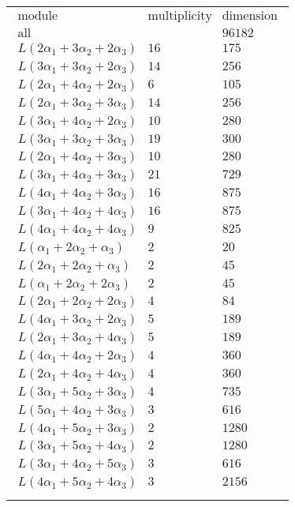 \documentclass[crop,border=2mm]{standalone}
\begin{document}
\begin{tabular}{l}
$\displaystyle
\begin{array}{rll}
	\text{module}&\text{multiplicity}&\text{dimension} \\ \hline \text{all}&&96182 \\
	L\left( 2\alpha_{1}+ 3\alpha_{2}+ 2\alpha_{3}\right)&16&175\\
	L\left( 3\alpha_{1}+ 3\alpha_{2}+ 2\alpha_{3}\right)&14&256\\
	L\left( 2\alpha_{1}+ 4\alpha_{2}+ 2\alpha_{3}\right)&6&105\\
	L\left( 2\alpha_{1}+ 3\alpha_{2}+ 3\alpha_{3}\right)&14&256\\
	L\left( 3\alpha_{1}+ 4\alpha_{2}+ 2\alpha_{3}\right)&10&280\\
	L\left( 3\alpha_{1}+ 3\alpha_{2}+ 3\alpha_{3}\right)&19&300\\
	L\left( 2\alpha_{1}+ 4\alpha_{2}+ 3\alpha_{3}\right)&10&280\\
	L\left( 3\alpha_{1}+ 4\alpha_{2}+ 3\alpha_{3}\right)&21&729\\
	L\left( 4\alpha_{1}+ 4\alpha_{2}+ 3\alpha_{3}\right)&16&875\\
	L\left( 3\alpha_{1}+ 4\alpha_{2}+ 4\alpha_{3}\right)&16&875\\
	L\left( 4\alpha_{1}+ 4\alpha_{2}+ 4\alpha_{3}\right)&9&825\\
	L\left(\alpha_{1}+ 2\alpha_{2}+\alpha_{3}\right)&2&20\\
	L\left( 2\alpha_{1}+ 2\alpha_{2}+\alpha_{3}\right)&2&45\\
	L\left(\alpha_{1}+ 2\alpha_{2}+ 2\alpha_{3}\right)&2&45\\
	L\left( 2\alpha_{1}+ 2\alpha_{2}+ 2\alpha_{3}\right)&4&84\\
	L\left( 4\alpha_{1}+ 3\alpha_{2}+ 2\alpha_{3}\right)&5&189\\
	L\left( 2\alpha_{1}+ 3\alpha_{2}+ 4\alpha_{3}\right)&5&189\\
	L\left( 4\alpha_{1}+ 4\alpha_{2}+ 2\alpha_{3}\right)&4&360\\
	L\left( 2\alpha_{1}+ 4\alpha_{2}+ 4\alpha_{3}\right)&4&360\\
	L\left( 3\alpha_{1}+ 5\alpha_{2}+ 3\alpha_{3}\right)&4&735\\
	L\left( 5\alpha_{1}+ 4\alpha_{2}+ 3\alpha_{3}\right)&3&616\\
	L\left( 4\alpha_{1}+ 5\alpha_{2}+ 3\alpha_{3}\right)&2&1280\\
	L\left( 3\alpha_{1}+ 5\alpha_{2}+ 4\alpha_{3}\right)&2&1280\\
	L\left( 3\alpha_{1}+ 4\alpha_{2}+ 5\alpha_{3}\right)&3&616\\
	L\left( 4\alpha_{1}+ 5\alpha_{2}+ 4\alpha_{3}\right)&3&2156
\end{array}
$ \\ \\

\end{tabular}
\end{document}
